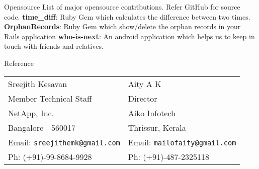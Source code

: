 \documentclass{resume}
\begin{document}

\begin{category}{Opensource}
  \citemnobullet List of major opensource contributions. Refer GitHub for source code.
  \citembullet \textbf{time\_diff}: Ruby Gem which calculates the difference between two times.
  \citembullet \textbf{OrphanRecords}: Ruby Gem which show/delete the orphan records in your Rails application
  \citembullet \textbf{who-is-next}: An android application which helps us to keep in touch with friends and relatives.
\end{category}


\begin{category}{Reference}
  \citemnobullet \\
  \begin{tabular}{ll}Sreejith Kesavan&Aity A K\\
    Member Technical Staff&Director\\
    NetApp, Inc.&Aiko Infotech\\
    Bangalore - 560017&Thrissur, Kerala\\
    Email: \mbox{\small\tt sreejithemk@gmail.com}&Email: \mbox{\small\tt mailofaity@gmail.com}\\
    Ph: (+91)-99-8684-9928&Ph: (+91)-487-2325118
  \end{tabular}
\end{category}
\end{document}
